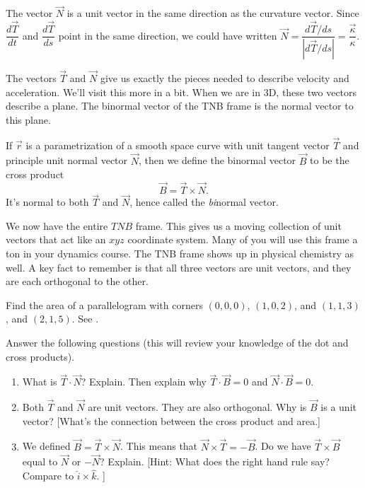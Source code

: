 The vector $\vec N$ is a unit vector in the same direction as the curvature vector.  Since $\dfrac{d\vec T}{dt}$ and $\dfrac{d\vec T}{ds}$ point in the same direction, we could have written $\vec N = \dfrac{d\vec T/ds}{|d\vec T/ds|} = \dfrac{\vec \kappa}{\kappa}$.

The vectors $\vec T$ and $\vec N$ give us exactly the pieces needed to describe velocity and acceleration.  We'll visit this more in a bit.  When we are in 3D, these two vectors describe a plane. The binormal vector of the TNB frame is the normal vector to this plane.  

\begin{definition}
 If $\vec r$ is a parametrization of a smooth space curve with unit tangent vector $\vec T$ and principle unit normal vector $\vec N$, then we define the binormal vector $\vec B$ to be the cross product
$$\vec B = \vec T\times \vec N.$$
 It's normal to both $\vec T$ and $\vec N$, hence called the \textit{bi}normal vector.
\end{definition}

We now have the entire $TNB$ frame.  This gives us a moving collection of unit vectors that act like an $xyz$ coordinate system.  Many of you will use this frame a ton in your dynamics course. The TNB frame shows up in physical chemistry as well. A key fact to remember is that all three vectors are unit vectors, and they are each orthogonal to the other.

\begin{review*}
 Find the area of a parallelogram with corners $(0,0,0)$, $(1,0,2)$, and $(1,1,3)$, and $(2,1,5)$.  See .
\end{review*}


\begin{problem}
Answer the following questions (this will review your knowledge of the dot and cross products).
\begin{enumerate}
 \item What is $\vec T\cdot \vec N$? Explain. Then explain why $\vec T\cdot \vec B=0$ and $\vec N\cdot \vec B=0$.
 \item Both $\vec T$ and $\vec N$ are unit vectors. They are also orthogonal. Why is $\vec B$ is a unit vector? [What's the connection between the cross product and area.] 
 \item We defined $\vec B=\vec T\times \vec N$. This means that $\vec N\times \vec T=-\vec B$.  Do we have $\vec T\times \vec B$ equal to $\vec N$ or $-\vec N$? Explain. [Hint: What does the right hand rule say? Compare to $\hat i\times \hat k$. ]
\end{enumerate}
\end{problem}

